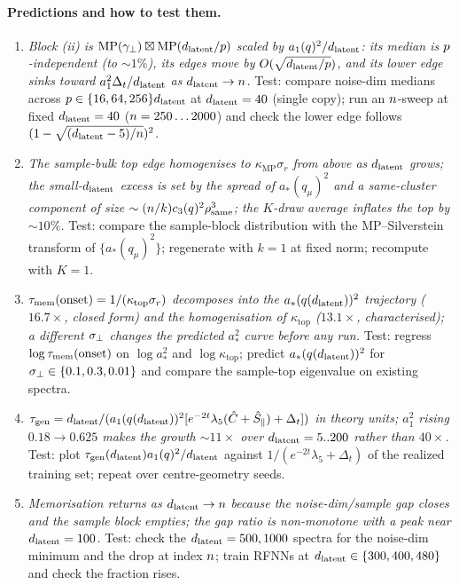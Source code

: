 \paragraph{Predictions and how to test them.}
\begin{enumerate}
\item \emph{Block (ii) is $\mathrm{MP}(\gamma_\perp)\boxtimes\mathrm{MP}(d_{\mathrm{latent}}/p)$ scaled by $a_1(q)^2/d_{\mathrm{latent}}$: its median is $p$-independent (to $\sim1\%$), its edges move by $O(\sqrt{d_{\mathrm{latent}}/p})$, and its lower edge sinks toward $a_1^2\Delta_t/d_{\mathrm{latent}}$ as $d_{\mathrm{latent}}\to n$.} Test: compare noise-dim medians across $p\in\{16,64,256\}d_{\mathrm{latent}}$ at $d_{\mathrm{latent}}=40$ (single copy); run an $n$-sweep at fixed $d_{\mathrm{latent}}=40$ ($n=250\ldots2000$) and check the lower edge follows $(1-\sqrt{(d_{\mathrm{latent}}-5)/n})^2$.
\item \emph{The sample-bulk top edge homogenises to $\kappa_{\mathrm{MP}}\sigma_r$ from above as $d_{\mathrm{latent}}$ grows; the small-$d_{\mathrm{latent}}$ excess is set by the spread of $a_*(q_\mu)^2$ and a same-cluster component of size $\sim(n/k)c_3(q)^2\rho_{\rm same}^3$; the $K$-draw average inflates the top by $\sim10\%$.} Test: compare the sample-block distribution with the MP--Silverstein transform of $\{a_*(q_\mu)^2\}$; regenerate with $k=1$ at fixed norm; recompute with $K=1$.
\item \emph{$\tau_{\mathrm{mem}}(\text{onset})=1/(\kappa_{\mathrm{top}}\sigma_r)$ decomposes into the $a_*(q(d_{\mathrm{latent}}))^2$ trajectory ($16.7\times$, closed form) and the homogenisation of $\kappa_{\mathrm{top}}$ ($13.1\times$, characterised); a different $\sigma_{\perp}$ changes the predicted $a_*^2$ curve before any run.} Test: regress $\log\tau_{\mathrm{mem}}(\text{onset})$ on $\log a_*^2$ and $\log\kappa_{\mathrm{top}}$; predict $a_*(q(d_{\mathrm{latent}}))^2$ for $\sigma_{\perp}\in\{0.1,0.3,0.01\}$ and compare the sample-top eigenvalue on existing spectra.
\item \emph{$\tau_{\mathrm{gen}}=d_{\mathrm{latent}}/(a_1(q(d_{\mathrm{latent}}))^2[e^{-2t}\lambda_5(\hat C+\hat S_\parallel)+\Delta_t])$ in theory units; $a_1^2$ rising $0.18\to0.625$ makes the growth $\sim11\times$ over $d_{\mathrm{latent}}=5..200$ rather than $40\times$.} Test: plot $\tau_{\mathrm{gen}}(d_{\mathrm{latent}})a_1(q)^2/d_{\mathrm{latent}}$ against $1/(e^{-2t}\lambda_5+\Delta_t)$ of the realized training set; repeat over centre-geometry seeds.
\item \emph{Memorisation returns as $d_{\mathrm{latent}}\to n$ because the noise-dim/sample gap closes and the sample block empties; the gap ratio is non-monotone with a peak near $d_{\mathrm{latent}}=100$.} Test: check the $d_{\mathrm{latent}}=500,1000$ spectra for the noise-dim minimum and the drop at index $n$; train RFNNs at $d_{\mathrm{latent}}\in\{300,400,480\}$ and check the fraction rises.

\end{enumerate}

